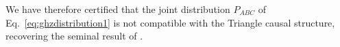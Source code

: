 We have therefore certified that the joint distribution $P_{A B C}$ of Eq.~\eqref{eq:ghzdistribution1} is not compatible with the Triangle causal structure, recovering the seminal result of \citet{steudel2010ancestors}.

